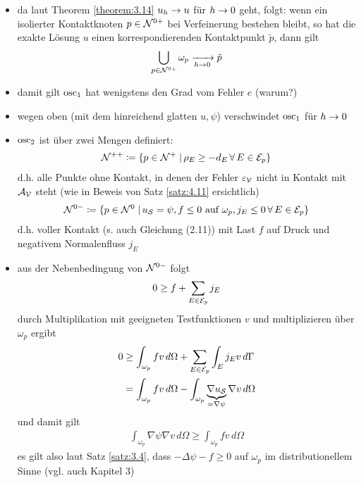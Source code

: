 \begin{itemize}
\item da laut Theorem \ref{theorem:3.14} $u_h \rightarrow u$ für $h\rightarrow 0$ geht, folgt: wenn ein isolierter Kontaktknoten $p \in \mathcal N^{0+}$ bei Verfeinerung bestehen bleibt, so hat die exakte Lösung $u$ einen korrespondierenden Kontaktpunkt $\tilde p$, dann gilt
\begin{align*}
	\bigcup_{p \in \mathcal N^{0+}} \omega_p \xrightarrow[h\rightarrow 0]{} \tilde p
\end{align*}

\item damit gilt $\operatorname{osc}_1$ hat wenigstens den Grad vom Fehler $e$ (warum?)

\item wegen oben (mit dem hinreichend glatten $u, \psi$) verschwindet $\operatorname{osc}_1$ für $h \rightarrow 0$

\item $\operatorname{osc}_2$ ist über zwei Mengen definiert:
\begin{align}
	\mathcal N^{++} \coloneqq \{p \in \mathcal N^{+}\;\vert\, \rho_E \ge - d_E \, \forall \, E \in \mathcal E_p\}
\end{align}
d.h. alle Punkte ohne Kontakt, in denen der Fehler $\varepsilon_{\mathcal V}$ nicht in Kontakt mit $\mathcal A_{\mathcal V}$ steht (wie in Beweis von Satz \ref{satz:4.11} ersichtlich)
\begin{align}
	\mathcal N^{0-}\coloneqq \{ p \in \mathcal N^0 \;\vert\, u_{\mathcal S} = \psi , f \le 0 \text{ auf } \omega_p, j_E \le 0 \, \forall \, E \in \mathcal E_p \}
\end{align}
d.h. voller Kontakt (s. auch \cite{SiebVee} Gleichung (2.11)) mit Last $f$ auf Druck und negativem Normalenfluss $j_E$

\item aus der Nebenbedingung von $\mathcal N^{0-}$ folgt
\begin{align*}
	0 \ge f + \sum_{E \in \mathcal E_p} j_E
\end{align*}
durch Multiplikation mit geeigneten Testfunktionen $v$ und multiplizieren über $\omega_p$ ergibt
\begin{align*}
	0 &  \ge \int_{\omega_p} f v \, d\Omega + \sum_{E\in \mathcal E_p} \int_E j_E v \, d \Gamma \\
	& = \int_{\omega_p} f v \, d \Omega - \int_{\omega_p} \underbrace{\nabla u_{\mathcal S}}_{=\nabla \psi} \nabla v \, d\Omega
\end{align*}
und damit gilt
\begin{align}
	 \int_{\omega_p} {\nabla \psi} \nabla v \, d\Omega \ge \int_{\omega_p} f v \, d \Omega
\end{align}
es gilt also laut Satz \ref{satz:3.4}, dass $-\Delta \psi - f \ge 0$ auf $\omega_p$ im distributionellem Sinne (vgl. auch \cite{Walker} Kapitel 3)


\end{itemize}
